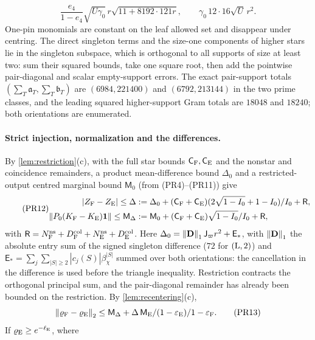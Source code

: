 \[
 \frac{e_4}{1-e_4}\sqrt{U\gamma_0}\,r\sqrt{11+8192\cdot121r},\qquad
 \gamma_0\,12\cdot16\sqrt U\,r^2.\tag{PR11}
\]
One-pin monomials are constant on the leaf allowed set and disappear under centring.
The direct singleton terms and the size-one components of higher stars lie in the
singleton subspace, which is orthogonal to all supports of size at least two: sum their
squared bounds, take one square root, then add the pointwise pair-diagonal and scalar
empty-support errors. The exact pair-support totals $(\sum_T\mathfrak a_T,\sum_T\mathfrak
b_T)$ are $(6984,221400)$ and $(6792,213144)$ in the two prime classes, and the leading
squared higher-support Gram totals are $18048$ and $18240$; both orientations are
enumerated.

\paragraph{Strict injection, normalization and the differences.}
By \cref{lem:restriction}(c), with the full star bounds $\mathsf C_{\rm F},\mathsf
C_{\rm E}$ and the nonstar and coincidence remainders, a product mean-difference bound
$\Delta_0$ and a restricted-output centred marginal bound $\mathsf M_0$ (from
(PR4)--(PR11)) give
\begin{equation}\tag{PR12}
\begin{aligned}
 |Z_{\rm F}-Z_{\rm E}|\le\Delta&:=\Delta_0+(\mathsf C_{\rm F}+\mathsf C_{\rm E})
 (2\sqrt{1-I_0}+1-I_0)/I_0+\mathsf R,\\
 \left\|P_0(K_{\rm F}-K_{\rm E})\mathbf 1\right\|\le\mathsf M_\Delta&:=\mathsf M_0
 +(\mathsf C_{\rm F}+\mathsf C_{\rm E})\sqrt{1-I_0}/I_0+\mathsf R,
\end{aligned}
\end{equation}
with $\mathsf R=N^{\rm ns}_{\rm F}+D^{\rm col}_{\rm F}+N^{\rm ns}_{\rm E}+D^{\rm col}_{\rm E}$.
Here $\Delta_0=\left\|\mathbf D\right\|_1\mathsf J_\varpi r^2+\mathsf E_*$, with $\left\|\mathbf D\right\|_1$ the
absolute entry sum of the signed singleton difference ($72$ for $({\rm L},2)$) and
$\mathsf E_*=\sum_j\sum_{|S|\ge2}|c_j(S)|\beta_\chi^{|S|}$ summed over both orientations:
the cancellation in the difference is used before the triangle inequality. Restriction
contracts the orthogonal principal sum, and the pair-diagonal remainder has already been
bounded on the restriction. By \cref{lem:recentering}(c),
\[
 \left\|\varrho_{\rm F}-\varrho_{\rm E}\right\|_2\le\mathsf M_\Delta
 +\Delta\,\mathsf M_{\rm E}/(1-\varepsilon_{\rm E})/1-\varepsilon_{\rm F} .\tag{PR13}
\]
If $\varrho_{\rm E}\ge e^{-\ell_{\rm E}}$, where
